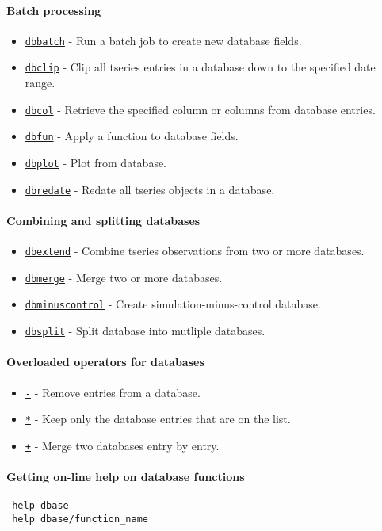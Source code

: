  \paragraph{Batch processing}
 
 \begin{itemize}
 \item
   \href{dbase/dbbatch}{\texttt{dbbatch}} - Run a batch job to create new
   database fields.
 \item
   \href{dbase/dbclip}{\texttt{dbclip}} - Clip all tseries entries in a
   database down to the specified date range.
 \item
   \href{dbase/dbcol}{\texttt{dbcol}} - Retrieve the specified column or
   columns from database entries.
 \item
   \href{dbase/dbfun}{\texttt{dbfun}} - Apply a function to database
   fields.
 \item
   \href{dbase/dbplot}{\texttt{dbplot}} - Plot from database.
 \item
   \href{dbase/dbredate}{\texttt{dbredate}} - Redate all tseries objects
   in a database.
 \end{itemize}
 
 \paragraph{Combining and splitting databases}
 
 \begin{itemize}
 \item
   \href{dbase/dbextend}{\texttt{dbextend}} - Combine tseries
   observations from two or more databases.
 \item
   \href{dbase/dbmerge}{\texttt{dbmerge}} - Merge two or more databases.
 \item
   \href{dbase/dbminuscontrol}{\texttt{dbminuscontrol}} - Create
   simulation-minus-control database.
 \item
   \href{dbase/dbsplit}{\texttt{dbsplit}} - Split database into mutliple
   databases.
 \end{itemize}
 
 \paragraph{Overloaded operators for databases}
 
 \begin{itemize}
 \item
   \href{struct/minus}{\texttt{-}} - Remove entries from a database.
 \item
   \href{struct/mtimes}{\texttt{*}} - Keep only the database entries that
   are on the list.
 \item
   \href{struct/plus}{\texttt{+}} - Merge two databases entry by entry.
 \end{itemize}
 
 \paragraph{Getting on-line help on database functions}
 
 \begin{verbatim}
 help dbase
 help dbase/function_name
 \end{verbatim}



